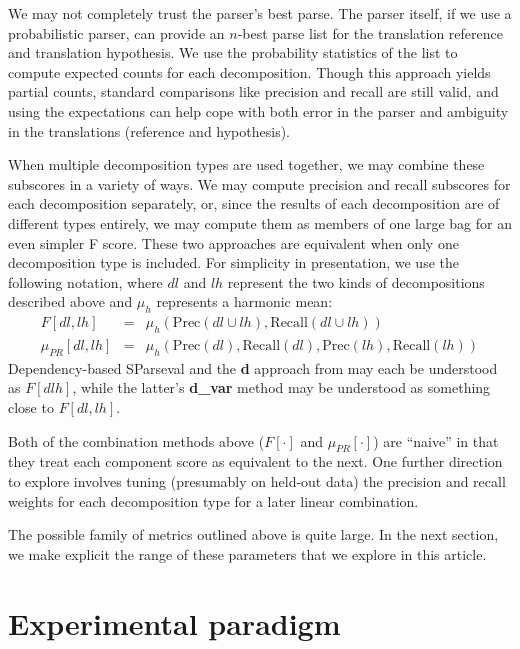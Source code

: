 \documentclass{kluwer}    %
\newcommand{\precision}[1]{\ensuremath{\textrm{Prec}\left(#1\right)}}
\newcommand{\recall}[1]{\ensuremath{\textrm{Recall}\left(#1\right)}}
\begin{document}
\begin{article}
We may not completely trust the parser's best parse.  The parser
itself, if we use a probabilistic parser, can provide an $n$-best
parse list for the translation reference and translation
hypothesis. We use the probability statistics of the list to compute
expected counts for each decomposition. Though this approach yields
partial counts, standard comparisons like precision and recall are
still valid, and using the expectations can help cope with both error
in the parser and ambiguity in the translations (reference and
hypothesis).


When multiple decomposition types are used together, we may combine
these subscores in a variety of ways.  We may compute precision and
recall subscores for each decomposition separately, or, since the
results of each decomposition are of different types entirely, we may
compute them as members of one large bag for an even simpler F score.
These two approaches are equivalent when only one decomposition type
is included.  For simplicity in presentation, we use the following
notation, where $dl$ and $lh$ represent the two kinds of
decompositions described above and $\mu_h$ represents a harmonic mean:
\begin{eqnarray}
  \label{eq:fprmeans}
  F[dl,lh] & = &
  \mu_h \left( \precision{dl \cup lh},
    \recall{dl \cup lh} \right) \\
  \mu_{PR}[dl,lh]  & = & \mu_h \left( \precision{dl},
    \recall{dl}, \precision{lh}, \recall{lh} \right)    
\end{eqnarray}
Dependency-based SParseval and the \textbf{d} approach from
 may each be understood as
$F[dlh]$, while the latter's \textbf{d\_var} method may be understood
as something close to $F[dl,lh]$.

Both of the combination methods above ($F[\cdot]$ and
$\mu_{PR}[\cdot]$) are ``naive'' in that they treat each component
score as equivalent to the next.  One further direction to explore
involves tuning (presumably on held-out data) the precision and recall
weights for each decomposition type for a later linear combination.

The possible family of metrics outlined above is quite large. In the
next section, we make explicit the range of these parameters that we
explore in this article.


\section{Experimental paradigm}
\label{sec:paradigm}


\end{article}
\end{document}
